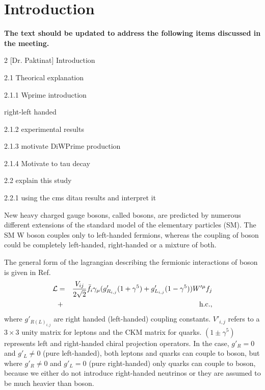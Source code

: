 \section{Introduction}\label{sec:int} 


{\bf The text should be updated to address the following items discussed in the meeting.}

2 [Dr. Paktinat] Introduction

2.1 Theorical explanation

2.1.1 Wprime introduction

right-left handed

2.1.2 experimental results

2.1.3 motivate DiWPrime production

2.1.4 Motivate to tau decay

2.2 explain this study

2.2.1 using the cms ditau results and interpret it




New heavy charged gauge bosons, called \wprime bosons, are predicted by numerous different extensions of the standard model of the elementary particles (SM). 
The SM W boson couples only to left-handed fermions, whereas the coupling of \wprime boson could be completely left-handed, right-handed or a mixture of both. 

The general form of the lagrangian describing the fermionic interactions of \wprime boson is given in  Ref.~\cite{Sullivan:2002jt}
\begin{eqnarray}
{\cal L}& =& \frac{V_{ij}}{2\sqrt{2}}\bar{f_i} \gamma_{\mu}(g^\prime_{R_{i,j}} (1+{\gamma}^5)+
g^\prime_{L_{i,j}}
(1-{\gamma}^5)) W^{\prime \mu} f_j  \nonumber\\
&+& \mathrm{h.c.},
\end{eqnarray}
where $g'_{R(L)_{i,j}}$ are right handed (left-handed) coupling constants. $V'_{i,j}$ refers to a $3\times3$ unity matrix for leptons and the CKM matrix for quarks. $(1\pm{\gamma^5})$ represents left and right-handed chiral projection operators. In the case, $g'_R = 0$ and $g'_L \neq 0$ (pure left-handed), both leptons and quarks can couple to \wprime boson, but where $g'_R \neq 0$ and $g'_L = 0$ (pure right-handed) only quarks can couple to \wprime boson, because we either do not introduce right-handed neutrinos or they are assumed to be much heavier than \wprime boson. 



